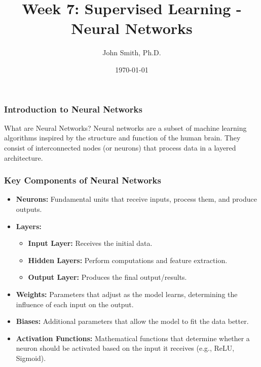 \documentclass[aspectratio=169]{beamer}
\title[Supervised Learning - Neural Networks]{Week 7: Supervised Learning - Neural Networks}
\author[J. Smith]{John Smith, Ph.D.}
\institute[University Name]{
  Department of Computer Science\\
  University Name\\
  \vspace{0.3cm}
  Email: email@university.edu\\
  Website: www.university.edu
}
\date{\today}
\begin{document}
\frame{\titlepage}

\begin{frame}[fragile]
    \frametitle{Introduction to Neural Networks}
    \begin{block}{What are Neural Networks?}
        Neural networks are a subset of machine learning algorithms inspired by the structure and function of the human brain. They consist of interconnected nodes (or neurons) that process data in a layered architecture.
    \end{block}
\end{frame}

\begin{frame}[fragile]
    \frametitle{Key Components of Neural Networks}
    \begin{itemize}
        \item \textbf{Neurons:} Fundamental units that receive inputs, process them, and produce outputs.
        \item \textbf{Layers:}
        \begin{itemize}
            \item \textbf{Input Layer:} Receives the initial data.
            \item \textbf{Hidden Layers:} Perform computations and feature extraction.
            \item \textbf{Output Layer:} Produces the final output/results.
        \end{itemize}
        \item \textbf{Weights:} Parameters that adjust as the model learns, determining the influence of each input on the output.
        \item \textbf{Biases:} Additional parameters that allow the model to fit the data better.
        \item \textbf{Activation Functions:} Mathematical functions that determine whether a neuron should be activated based on the input it receives (e.g., ReLU, Sigmoid).
    \end{itemize}
\end{frame}
\end{document}
